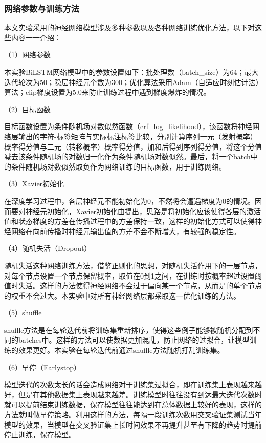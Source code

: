 \documentclass[winfonts,master,oneside,nobackinfo]{njuthesis}
\begin{document}
\subsubsection{网络参数与训练方法}

本文实验采用的神经网络模型涉及多种参数以及各种网络训练优化方法，以下对这些内容一一介绍：

（1）网络参数

本实验BiLSTM网络模型中的参数设置如下：批处理数（batch\_size）为64；最大迭代轮次为50；隐层神经元个数为300；优化算法采用Adam\cite{Adam}（自适应时刻估计法）算法；clip梯度设置为5.0来防止训练过程中遇到梯度爆炸的情况。

（2）目标函数

目标函数设置为条件随机场对数似然函数（crf\_log\_likelihood），该函数将神经网络层输出的字符-标签矩阵与实际标注标签比较，分别计算序列一元（发射概率）概率得分值与二元（转移概率）概率得分值，加和后得到序列得分值，将这个分值减去该条件随机场的对数归一化作为条件随机场对数似然。最后，将一个batch中的条件随机场对数似然取负作为网络训练的目标函数，用于训练网络。

（3）Xavier初始化

在深度学习过程中，各层神经元不能初始化为0，不然将会遭遇梯度为0的情况。因而要对神经元初始化，Xavier初始化由\cite{Glorot}提出，思路是将初始化应该使得各层的激活值和状态梯度的方差在传播过程中的方差保持一致，这样的初始化方式可以使得神经网络在向前传播时神经元输出值的方差不会不断增大，有较强的稳定性。

（4）随机失活（Dropout）

随机失活这种网络训练方法，借鉴正则化的思想，对随机失活作用下的一层节点，对每个节点设置一个节点保留概率，取值在0到1之间，在训练时按概率超过设置阈值时失活。这样的方法使得神经网络不会过于偏向某一个节点，从而是的单个节点的权重不会过大。本实验中对所有神经网络层都采取这一优化训练的方法。

（5）shuffle

shuffle方法是在每轮迭代前将训练集重新排序，使得这些例子能够被随机分配到不同的batches中。这样的方法可以使数据更加混乱，防止网络的过拟合，让模型训练的效果更好。本实验在每轮迭代前通过shuffle方法随机打乱训练集。

（6）早停（Earlystop）

模型迭代的次数太长的话会造成网络对于训练集过拟合，即在训练集上表现越来越好，但是在其他数据集上表现越来越差。训练模型时往往没有到达最大迭代次数时就可以提前结束训练数据，保存模型往往能达到在总体数据上较好的表现，这样的方法就叫做早停策略。利用这样的方法，每隔一段训练次数用交叉验证集测试当年模型的效果，当模型在交叉验证集上长时间效果不再提升甚至有下降的趋势时提前停止训练，保存模型。
\end{document}
